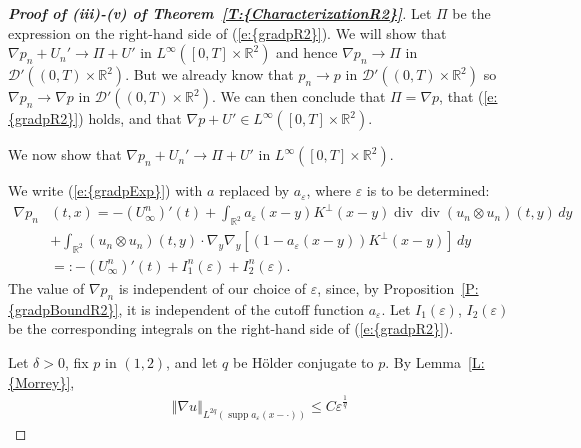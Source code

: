 \documentclass[reqno,openright,11pt,twoside]{amsart}
\theoremstyle{definition}
\numberwithin{equation}{section}
\begin{document}
\begin{proof}[\textbf{Proof of {\textit{({iii})}}-{\textit{({v})}} of {Theorem~\ref{T:{CharacterizationR2}}}}]
Let $\Pi$ be the expression on the right-hand side of {(\ref{e:{gradpR2}})}. We will show that ${\ensuremath{\nabla}} p_n + U_n' \to \Pi + U'$ in $L^{\ensuremath{\infty}}([0, T] \times {\ensuremath{{\ensuremath{\mathbb{{R}}}}}}^2)$ and hence ${\ensuremath{\nabla}} p_n \to \Pi$ in ${\ensuremath{\mathcal{{D}}}}'((0, T) \times {\ensuremath{{\ensuremath{\mathbb{{R}}}}}}^2)$. But we already know that $p_n \to p$ in ${\ensuremath{\mathcal{{D}}}}'((0, T) \times {\ensuremath{{\ensuremath{\mathbb{{R}}}}}}^2)$ so ${\ensuremath{\nabla}} p_n \to {\ensuremath{\nabla}} p$ in ${\ensuremath{\mathcal{{D}}}}'((0, T) \times {\ensuremath{{\ensuremath{\mathbb{{R}}}}}}^2)$. We can then conclude that $\Pi = {\ensuremath{\nabla}} p$, that {(\ref{e:{gradpR2}})} holds, and that ${\ensuremath{\nabla}} p + U' \in L^{\ensuremath{\infty}}([0, T] \times {\ensuremath{{\ensuremath{\mathbb{{R}}}}}}^2)$.

We now show that ${\ensuremath{\nabla}} p_n + U_n' \to \Pi + U'$ in $L^{\ensuremath{\infty}}([0, T] \times {\ensuremath{{\ensuremath{\mathbb{{R}}}}}}^2)$.

We write {(\ref{e:{gradpExp}})} with $a$ replaced by $a_{\ensuremath{\varepsilon}}$, where ${\ensuremath{\varepsilon}}$ is to be determined:
\begin{align*}
		{\ensuremath{\nabla}} p_n&(t, x)
			= -(U_{\ensuremath{\infty}}^n)'(t)
				+ \int_{{\ensuremath{{\ensuremath{\mathbb{{R}}}}}}^2} a_{\ensuremath{\varepsilon}}(x - y) K^\perp(x - y)
				    \operatorname{div} \operatorname{div} (u_n \otimes u_n)(t, y) \, dy \\
			&
	 			+ \int_{{\ensuremath{{\ensuremath{\mathbb{{R}}}}}}^2} (u_n \otimes u_n)(t, y) \cdot
					{\ensuremath{\nabla}}_y {\ensuremath{\nabla}}_y {\ensuremath{\left[ {(1 - a_{\ensuremath{\varepsilon}}(x - y))
					    K^\perp(x - y)} \right]}}
					\, dy \\
		&=: -(U_{\ensuremath{\infty}}^n)'(t) + I_1^n({\ensuremath{\varepsilon}}) + I_2^n({\ensuremath{\varepsilon}}).
\end{align*}
The value of ${\ensuremath{\nabla}} p_n$ is independent of our choice of ${\ensuremath{\varepsilon}}$, since, by {Proposition~\ref{P:{gradpBoundR2}}}, it is independent of the cutoff function $a_{\ensuremath{\varepsilon}}$.
Let  $I_1({\ensuremath{\varepsilon}})$, $I_2({\ensuremath{\varepsilon}})$ be the corresponding integrals on the right-hand side of {(\ref{e:{gradpR2}})}.

Let $\delta > 0$, fix $p$ in $(1, 2)$, and let $q$ be {H\"{o}lder\xspace} conjugate to $p$. By {Lemma~\ref{L:{Morrey}}},
\begin{align*}
	{\ensuremath{\left\Vert {{\ensuremath{\nabla}} u} \right\Vert}}_{L^{2q}(\operatorname{supp} a_{\ensuremath{\varepsilon}}(x - \cdot))}
		\le C {\ensuremath{\varepsilon}}^{\frac{1}{q}}
		

\end{align*}
\end{proof}
\end{document}
